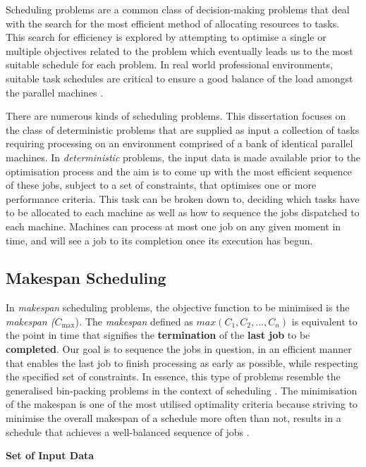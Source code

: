 Scheduling problems are a common class of decision-making problems that deal with the search for the most efficient method of allocating resources to tasks. This search for efficiency is explored by attempting to optimise a single or multiple objectives related to the problem which eventually leads us to the most suitable schedule for each problem. In real world professional environments, suitable task schedules are critical to ensure a good balance of the load amongst the parallel machines \cite{DUMMY:2}.\par
\vspace{\baselineskip}
\noindent
There are numerous kinds of scheduling problems. This dissertation focuses on the class of deterministic problems that are supplied as input a collection of tasks requiring processing on an environment comprised of a bank of identical parallel machines. In \textit{deterministic} problems, the input data is made available prior to the optimisation process and the aim is to come up with the most efficient sequence of these jobs, subject to a set of constraints, that optimises one or more performance criteria. This task can be broken down to, deciding which tasks have to be allocated to each machine as well as how to sequence the jobs dispatched to each machine. Machines can process at most one job on any given moment in time, and will see a job to its completion once its execution has begun. \par


\subsection*{Makespan Scheduling}
\label{section:Makespan Scheduling}
In \textit{makespan} scheduling problems, the objective function to be minimised is the \textit{makespan (\( C_{\max }\)})\textit{. }The \textit{makespan }defined as  \( max \left( C_{1},C_{2},...,C_{n} \right)   \) is equivalent to the point in time that signifies the \textbf{termination} of the\textbf{ last job} to be \textbf{completed}. Our goal is to sequence the jobs in question, in an efficient manner that enables the last job to finish processing as early as possible, while respecting the specified set of constraints. In essence, this type of problems resemble the generalised bin-packing problems in the context of scheduling \cite{Coffman1978AnAO}. The minimisation of the makespan is one of the most utilised optimality criteria \cite{schedalgos} because striving to minimise the overall makespan of a schedule more often than not, results in a schedule that achieves a well-balanced sequence of jobs \cite{DUMMY:2}. \par
\vspace{\baselineskip}
\noindent
\textbf{Set of Input Data}

